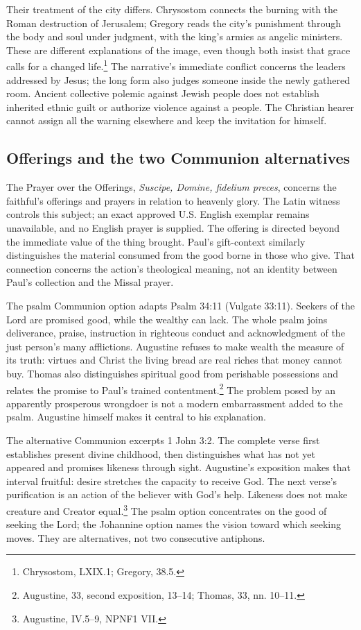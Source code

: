 Their treatment of the city differs. Chrysostom connects the burning with the Roman destruction of Jerusalem; Gregory reads the city's punishment through the body and soul under judgment, with the king's armies as angelic ministers. These are different explanations of the image, even though both insist that grace calls for a changed life.\footnote{Chrysostom,  LXIX.1; Gregory,  38.5.} The narrative's immediate conflict concerns the leaders addressed by Jesus; the long form also judges someone inside the newly gathered room. Ancient collective polemic against Jewish people does not establish inherited ethnic guilt or authorize violence against a people. The Christian hearer cannot assign all the warning elsewhere and keep the invitation for himself.

\subsection{Offerings and the two Communion alternatives}
\label{proper-offerings}
The Prayer over the Offerings, \textit{Suscipe, Domine, fidelium preces}, concerns the faithful's offerings and prayers in relation to heavenly glory. The Latin witness controls this subject; an exact approved U.S. English exemplar remains unavailable, and no English prayer is supplied. The offering is directed beyond the immediate value of the thing brought. Paul's gift-context similarly distinguishes the material consumed from the good borne in those who give. That connection concerns the action's theological meaning, not an identity between Paul's collection and the Missal prayer.

The psalm Communion option adapts Psalm 34:11 (Vulgate 33:11). Seekers of the Lord are promised good, while the wealthy can lack. The whole psalm joins deliverance, praise, instruction in righteous conduct and acknowledgment of the just person's many afflictions. Augustine refuses to make wealth the measure of its truth: virtues and Christ the living bread are real riches that money cannot buy. Thomas also distinguishes spiritual good from perishable possessions and relates the promise to Paul's trained contentment.\footnote{Augustine,  33, second exposition, 13--14; Thomas,  33, nn. 10--11.} The problem posed by an apparently prosperous wrongdoer is not a modern embarrassment added to the psalm. Augustine himself makes it central to his explanation.

The alternative Communion excerpts 1 John 3:2. The complete verse first establishes present divine childhood, then distinguishes what has not yet appeared and promises likeness through sight. Augustine's exposition makes that interval fruitful: desire stretches the capacity to receive God. The next verse's purification is an action of the believer with God's help. Likeness does not make creature and Creator equal.\footnote{Augustine,  IV.5--9, NPNF1 VII.} The psalm option concentrates on the good of seeking the Lord; the Johannine option names the vision toward which seeking moves. They are alternatives, not two consecutive antiphons.

